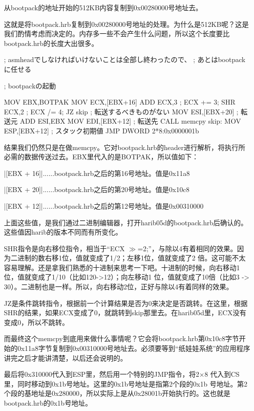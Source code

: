 从bootpack的地址开始的512KB内容复制到0x00280000号地址去。

这就是将bootpack.hrb复制到0x00280000号地址的处理。为什么是512KB呢？这是我们酌情考虑而决定的。内存多一些不会产生什么问题，所以这个长度要比bootpack.hrb的长度大出很多。

\cs

\begin{code}[label=asmhead.nas节选（续）]
; asmheadでしなければいけないことは全部し終わったので、
;	あとはbootpackに任せる

; bootpackの起動

		MOV		EBX,BOTPAK
		MOV		ECX,[EBX+16]
		ADD		ECX,3			; ECX += 3;
		SHR		ECX,2			; ECX /= 4;
		JZ		skip			; 転送するべきものがない
		MOV		ESI,[EBX+20]	; 転送元
		ADD		ESI,EBX
		MOV		EDI,[EBX+12]	; 転送先
		CALL	memcpy
skip:
		MOV		ESP,[EBX+12]	; スタック初期値
		JMP		DWORD 2*8:0x0000001b
\end{code}

结果我们仍然只是在做memcpy。它对bootpack.hrb的header进行解析，将执行所必需的数据传送过去。EBX里代入的是BOTPAK，所以值如下：

|[EBX + 16]|......bootpack.hrb之后的第16号地址。值是0x11a8

|[EBX + 20]|......bootpack.hrb之后的第20号地址。值是0x10c8

|[EBX + 12]|......bootpack.hrb之后的第12号地址。值是0x00310000

上面这些值，是我们通过二进制编辑器，打开harib05d的bootpack.hrb后确认的。这些值因harib的版本不同而有所变化。

SHR指令是向右移位指令，相当于“ECX $\gg$=2;”，与除以4有着相同的效果。因为二进制的数右移1位，值就变成了1/2；左移1位，值就变成了2 倍。这可能不太容易理解。还是拿我们熟悉的十进制来思考一下吧。十进制的时候，向右移动1 位，值就变成了1/10（比如120->12）；向左移动1 位，值就变成了10倍（比如3 -> 30）。二进制也是一样。所以，向右移动2位，正好与除以4有着同样的效果。

JZ是条件跳转指令，根据前一个计算结果是否为0来决定是否跳转。在这里，根据SHR的结果，如果ECX变成了0，就跳转到skip那里去。在harib05d里，ECX没有变成0，所以不跳转。

而最终这个memcpy到底用来做什么事情呢？它会将bootpack.hrb第0x10c8字节开始的0x11a8字节复制到0x00310000号地址去。必须要等到“纸娃娃系统”的应用程序讲完之后才能讲清楚，以后还会说明的。

最后将0x310000代入到ESP里，然后用一个特别的JMP指令，将2$\times$8 代入到CS 里，同时移动到0x1b号地址。这里的0x1b号地址是指第2个段的0x1b 号地址。第2个段的基地址是0x280000，所以实际上是从0x28001b开始执行的。这也就是bootpack.hrb的0x1b号地址。

